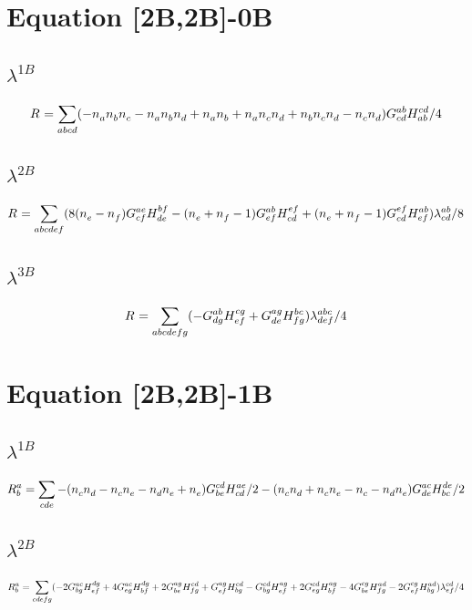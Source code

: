\documentclass{scrartcl}
\begin{document}
    
\section{Equation [2B,2B]-0B}
\subsection{$\lambda^{1B}$}
\begin{dmath*}
R^{}_{} = \sum_{abcd} (-n^{}_{a} \* n^{}_{b} \* n^{}_{c}-n^{}_{a} \* n^{}_{b} \* n^{}_{d}+n^{}_{a} \* n^{}_{b}+n^{}_{a} \* n^{}_{c} \* n^{}_{d}+n^{}_{b} \* n^{}_{c} \* n^{}_{d}-n^{}_{c} \* n^{}_{d}) \* G^{ab}_{cd} \* H^{cd}_{ab}/4
\end{dmath*}
\subsection{$\lambda^{2B}$}
\begin{dmath*}
R^{}_{} = \sum_{abcdef} (8 \* (n^{}_{e}-n^{}_{f}) \* G^{ae}_{cf} \* H^{bf}_{de}-(n^{}_{e}+n^{}_{f}-1) \* G^{ab}_{ef} \* H^{ef}_{cd}+(n^{}_{e}+n^{}_{f}-1) \* G^{ef}_{cd} \* H^{ab}_{ef}) \* \lambda^{ab}_{cd}/8
\end{dmath*}
\subsection{$\lambda^{3B}$}
\begin{dmath*}
R^{}_{} = \sum_{abcdefg} (-G^{ab}_{dg} \* H^{cg}_{ef}+G^{ag}_{de} \* H^{bc}_{fg}) \* \lambda^{abc}_{def}/4
\end{dmath*}
\section{Equation [2B,2B]-1B}
\subsection{$\lambda^{1B}$}
\begin{dmath*}
R^{a}_{b} = \sum_{cde} -(n^{}_{c} \* n^{}_{d}-n^{}_{c} \* n^{}_{e}-n^{}_{d} \* n^{}_{e}+n^{}_{e}) \* G^{cd}_{be} \* H^{ae}_{cd}/2-(n^{}_{c} \* n^{}_{d}+n^{}_{c} \* n^{}_{e}-n^{}_{c}-n^{}_{d} \* n^{}_{e}) \* G^{ac}_{de} \* H^{de}_{bc}/2
\end{dmath*}
\subsection{$\lambda^{2B}$}
\begin{dmath*}
R^{a}_{b} = \sum_{cdefg} (-2 \* G^{ac}_{bg} \* H^{dg}_{ef}+4 \* G^{ac}_{eg} \* H^{dg}_{bf}+2 \* G^{ag}_{be} \* H^{cd}_{fg}+G^{ag}_{ef} \* H^{cd}_{bg}-G^{cd}_{bg} \* H^{ag}_{ef}+2 \* G^{cd}_{eg} \* H^{ag}_{bf}-4 \* G^{cg}_{be} \* H^{ad}_{fg}-2 \* G^{cg}_{ef} \* H^{ad}_{bg}) \* \lambda^{cd}_{ef}/4
\end{dmath*}
\end{document}
